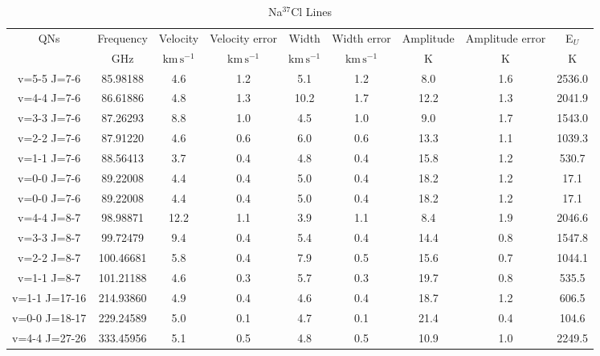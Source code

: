 \begin{table*}[htp]
\centering
\caption{Na$^{37}$Cl Lines}
\begin{tabular}{ccccccccc}
\label{tab:Na37Cl_salt_lines}
QNs & Frequency & Velocity & Velocity error & Width & Width error & Amplitude & Amplitude error & E$_U$ \\
 & $\mathrm{GHz}$ & $\mathrm{km\,s^{-1}}$ & $\mathrm{km\,s^{-1}}$ & $\mathrm{km\,s^{-1}}$ & $\mathrm{km\,s^{-1}}$ & $\mathrm{K}$ & $\mathrm{K}$ & $\mathrm{K}$ \\
\hline
v=5-5 J=7-6 & 85.98188 & 4.6 & 1.2 & 5.1 & 1.2 & 8.0 & 1.6 & 2536.0 \\
v=4-4 J=7-6 & 86.61886 & 4.8 & 1.3 & 10.2 & 1.7 & 12.2 & 1.3 & 2041.9 \\
v=3-3 J=7-6 & 87.26293 & 8.8 & 1.0 & 4.5 & 1.0 & 9.0 & 1.7 & 1543.0 \\
v=2-2 J=7-6 & 87.91220 & 4.6 & 0.6 & 6.0 & 0.6 & 13.3 & 1.1 & 1039.3 \\
v=1-1 J=7-6 & 88.56413 & 3.7 & 0.4 & 4.8 & 0.4 & 15.8 & 1.2 & 530.7 \\
v=0-0 J=7-6 & 89.22008 & 4.4 & 0.4 & 5.0 & 0.4 & 18.2 & 1.2 & 17.1 \\
v=0-0 J=7-6 & 89.22008 & 4.4 & 0.4 & 5.0 & 0.4 & 18.2 & 1.2 & 17.1 \\
v=4-4 J=8-7 & 98.98871 & 12.2 & 1.1 & 3.9 & 1.1 & 8.4 & 1.9 & 2046.6 \\
v=3-3 J=8-7 & 99.72479 & 9.4 & 0.4 & 5.4 & 0.4 & 14.4 & 0.8 & 1547.8 \\
v=2-2 J=8-7 & 100.46681 & 5.8 & 0.4 & 7.9 & 0.5 & 15.6 & 0.7 & 1044.1 \\
v=1-1 J=8-7 & 101.21188 & 4.6 & 0.3 & 5.7 & 0.3 & 19.7 & 0.8 & 535.5 \\
v=1-1 J=17-16 & 214.93860 & 4.9 & 0.4 & 4.6 & 0.4 & 18.7 & 1.2 & 606.5 \\
v=0-0 J=18-17 & 229.24589 & 5.0 & 0.1 & 4.7 & 0.1 & 21.4 & 0.4 & 104.6 \\
v=4-4 J=27-26 & 333.45956 & 5.1 & 0.5 & 4.8 & 0.5 & 10.9 & 1.0 & 2249.5 \\
\hline
\end{tabular}

\par 
\end{table*}
